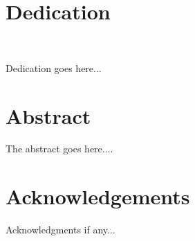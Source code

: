 \documentclass[12pt]{report}
\begin{document}
{}


\chapter*{Dedication}\

Dedication goes here... 


\chapter*{Abstract}

The abstract goes here....


\chapter*{Acknowledgements}

Acknowledgments if any...


\tableofcontents{}

\listoftables{}

\listoffigures{}



\thispagestyle{noheaderfooter}
















\appendix


\end{document}
